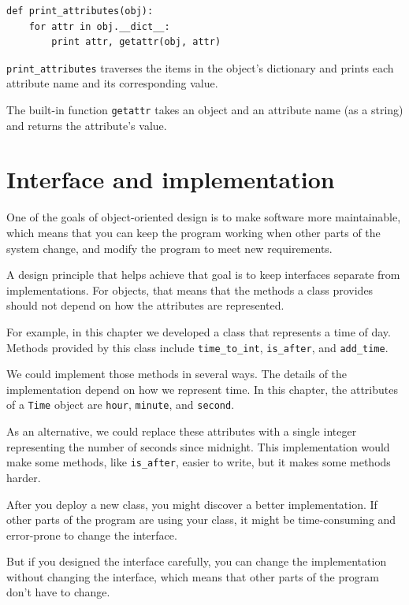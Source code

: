 \documentclass[12pt,a4paper,final,twoside,onecolumn,titlepage]{book}
\begin{document}
\begin{verbatim}
def print_attributes(obj):
    for attr in obj.__dict__:
        print attr, getattr(obj, attr)
\end{verbatim}
%
\verb"print_attributes" traverses the items in the object's dictionary
and prints each attribute name and its corresponding value.

The built-in function {\tt getattr} takes an object and an attribute
name (as a string) and returns the attribute's value.


\section{Interface and implementation}

One of the goals of object-oriented design is to make software more
maintainable, which means that you can keep the program working when
other parts of the system change, and modify the program to meet new
requirements.

A design principle that helps achieve that goal is to keep
interfaces separate from implementations.  For objects, that means
that the methods a class provides should not depend on how the
attributes are represented.

For example, in this chapter we developed a class that represents
a time of day.  Methods provided by this class include
\verb"time_to_int", \verb"is_after", and \verb"add_time".

We could implement those methods in several ways.  The details of the
implementation depend on how we represent time.  In this chapter, the
attributes of a {\tt Time} object are {\tt hour}, {\tt minute}, and
{\tt second}.

As an alternative, we could replace these attributes with
a single integer representing the number of seconds
since midnight.  This implementation would make some methods,
like \verb"is_after", easier to write, but it makes some methods
harder.

After you deploy a new class, you might discover a better
implementation.  If other parts of the program are using your
class, it might be time-consuming and error-prone to change the
interface.  

But if you designed the interface carefully, you can
change the implementation without changing the interface, which
means that other parts of the program don't have to change.
\end{document}
